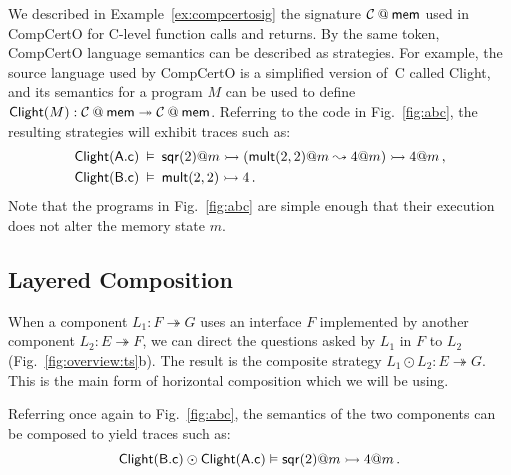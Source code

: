 \begin{example} \label{ex:compcertosem} %
We described in Example~\ref{ex:compcertosig}
the signature $\mathcal{C} \mathbin@ \kw{mem}$
used in CompCertO for C-level function calls and returns.
By the same token, CompCertO language semantics
can be described as strategies.
For example,
the source language used by CompCertO
is a simplified version of~C called Clight,
and its semantics for a program $M$ can be used to define
$
  \kw{Clight}(M) : \mathcal{C} \mathbin@ \kw{mem}
    \twoheadrightarrow \mathcal{C} \mathbin@ \kw{mem}
$.
Referring to the code in Fig.~\ref{fig:abc},
the resulting strategies will exhibit traces such as:
\begin{align*}
   \mathsf{Clight} ( \mathsf{A.c} ) \:&\vDash\:
   \mathsf{sqr} (2)@m \rightarrowtail
  ( \mathsf{mult} (2,2)@m \leadsto 4@m) \rightarrowtail
  4@m \,,
\\
   \mathsf{Clight} ( \mathsf{B.c} ) \:&\vDash\:
   \mathsf{mult} (2,2) \rightarrowtail 4
  \,.
\end{align*}
Note that the programs in Fig.~\ref{fig:abc} are simple enough that
their execution does not alter the memory state $m$.
\end{example}


\subsection{Layered Composition} %

When a component $L_1 : F \twoheadrightarrow G$
uses an interface $F$ implemented by
another component $L_2 : E \twoheadrightarrow F$,
we can direct the questions asked by $L_1$ in $F$ to $L_2$
(Fig.~\ref{fig:overview:ts}b).
The result is the composite strategy
$L_1 \odot L_2 : E \twoheadrightarrow G$. %
This is the main form of horizontal composition which we will be using.

\begin{example} %
Referring once again to Fig.~\ref{fig:abc},
the semantics of the two components can be composed
to yield traces such as:
\[
   \mathsf{Clight} ( \mathsf{B.c} ) \odot  \mathsf{Clight} ( \mathsf{A.c} )
  \vDash
   \mathsf{sqr} (2)@m \rightarrowtail 4@m
  \,.
\]
\end{example}

